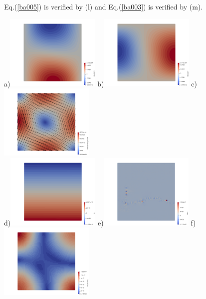 Eq.(\ref{ba005}) is verified by (l) and Eq.(\ref{ba003}) is verified by (m).

\newpage
\begin{center}
a)\includegraphics[width=4.5cm]{python_codes/fieldstone_24/EBA_104/u.png}
b)\includegraphics[width=4.5cm]{python_codes/fieldstone_24/EBA_104/v.png}
c)\includegraphics[width=4.5cm]{python_codes/fieldstone_24/EBA_104/vel.png}\\
d)\includegraphics[width=4.5cm]{python_codes/fieldstone_24/EBA_104/q.png}    
e)\includegraphics[width=4.5cm]{python_codes/fieldstone_24/EBA_104/divv.png}    
f)\includegraphics[width=4.5cm]{python_codes/fieldstone_24/EBA_104/e2.png}   \\

\end{center}
